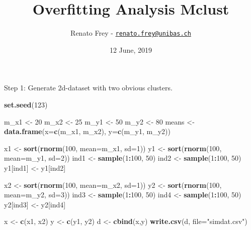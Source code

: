 \documentclass[]{article}
\title{Overfitting Analysis Mclust}
\author{Renato Frey -
\href{mailto:renato.frey@unibas.ch}{\nolinkurl{renato.frey@unibas.ch}}}
\date{12 June, 2019}
\newenvironment{Shaded}{\begin{snugshade}}{\end{snugshade}}
\newcommand{\DataTypeTok}[1]{\textcolor[rgb]{0.13,0.29,0.53}{#1}}
\newcommand{\DecValTok}[1]{\textcolor[rgb]{0.00,0.00,0.81}{#1}}
\newcommand{\KeywordTok}[1]{\textcolor[rgb]{0.13,0.29,0.53}{\textbf{#1}}}
\newcommand{\NormalTok}[1]{#1}
\newcommand{\OperatorTok}[1]{\textcolor[rgb]{0.81,0.36,0.00}{\textbf{#1}}}
\newcommand{\StringTok}[1]{\textcolor[rgb]{0.31,0.60,0.02}{#1}}
\begin{document}
\maketitle

Step 1: Generate 2d-dataset with two obvious clusters.

\begin{Shaded}
\begin{Highlighting}[]
\KeywordTok{set.seed}\NormalTok{(}\DecValTok{123}\NormalTok{)}

\NormalTok{m_x1 <-}\StringTok{ }\DecValTok{20}
\NormalTok{m_x2 <-}\StringTok{ }\DecValTok{25}
\NormalTok{m_y1 <-}\StringTok{ }\DecValTok{50}
\NormalTok{m_y2 <-}\StringTok{ }\DecValTok{80}
\NormalTok{means <-}\StringTok{ }\KeywordTok{data.frame}\NormalTok{(}\DataTypeTok{x=}\KeywordTok{c}\NormalTok{(m_x1, m_x2), }\DataTypeTok{y=}\KeywordTok{c}\NormalTok{(m_y1, m_y2))}

\NormalTok{x1 <-}\StringTok{ }\KeywordTok{sort}\NormalTok{(}\KeywordTok{rnorm}\NormalTok{(}\DecValTok{100}\NormalTok{, }\DataTypeTok{mean=}\NormalTok{m_x1, }\DataTypeTok{sd=}\DecValTok{1}\NormalTok{))}
\NormalTok{y1 <-}\StringTok{ }\KeywordTok{sort}\NormalTok{(}\KeywordTok{rnorm}\NormalTok{(}\DecValTok{100}\NormalTok{, }\DataTypeTok{mean=}\NormalTok{m_y1, }\DataTypeTok{sd=}\DecValTok{2}\NormalTok{))}
\NormalTok{ind1 <-}\StringTok{ }\KeywordTok{sample}\NormalTok{(}\DecValTok{1}\OperatorTok{:}\DecValTok{100}\NormalTok{, }\DecValTok{50}\NormalTok{)}
\NormalTok{ind2 <-}\StringTok{ }\KeywordTok{sample}\NormalTok{(}\DecValTok{1}\OperatorTok{:}\DecValTok{100}\NormalTok{, }\DecValTok{50}\NormalTok{)}
\NormalTok{y1[ind1] <-}\StringTok{ }\NormalTok{y1[ind2]}

\NormalTok{x2 <-}\StringTok{ }\KeywordTok{sort}\NormalTok{(}\KeywordTok{rnorm}\NormalTok{(}\DecValTok{100}\NormalTok{, }\DataTypeTok{mean=}\NormalTok{m_x2, }\DataTypeTok{sd=}\DecValTok{1}\NormalTok{))}
\NormalTok{y2 <-}\StringTok{ }\KeywordTok{sort}\NormalTok{(}\KeywordTok{rnorm}\NormalTok{(}\DecValTok{100}\NormalTok{, }\DataTypeTok{mean=}\NormalTok{m_y2, }\DataTypeTok{sd=}\DecValTok{3}\NormalTok{))}
\NormalTok{ind3 <-}\StringTok{ }\KeywordTok{sample}\NormalTok{(}\DecValTok{1}\OperatorTok{:}\DecValTok{100}\NormalTok{, }\DecValTok{50}\NormalTok{)}
\NormalTok{ind4 <-}\StringTok{ }\KeywordTok{sample}\NormalTok{(}\DecValTok{1}\OperatorTok{:}\DecValTok{100}\NormalTok{, }\DecValTok{50}\NormalTok{)}
\NormalTok{y2[ind3] <-}\StringTok{ }\NormalTok{y2[ind4]}

\NormalTok{x <-}\StringTok{ }\KeywordTok{c}\NormalTok{(x1, x2)}
\NormalTok{y <-}\StringTok{ }\KeywordTok{c}\NormalTok{(y1, y2)}
\NormalTok{d <-}\StringTok{ }\KeywordTok{cbind}\NormalTok{(x,y)}
\KeywordTok{write.csv}\NormalTok{(d, }\DataTypeTok{file=}\StringTok{"simdat.csv"}\NormalTok{)}


\end{Highlighting}
\end{Shaded}
\end{document}
